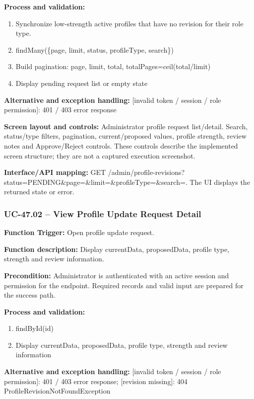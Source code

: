 \textbf{Process and validation:}
\begin{enumerate}
\item Synchronize low-strength active profiles that have no revision for their role type.
\item find\allowbreak{}Many(\{page, limit, status, profile\allowbreak{}Type, search\})
\item Build pagination: page, limit, total, total\allowbreak{}Pages=\allowbreak{}ceil(total/\allowbreak{}limit)
\item Display pending request list or empty state
\end{enumerate}
\textbf{Alternative and exception handling:} [invalid token /\allowbreak{} session /\allowbreak{} role permission]: 401 /\allowbreak{} 403 error response

\textbf{Screen layout and controls:} Administrator profile request list/\allowbreak{}detail. Search, status/\allowbreak{}type filters, pagination, current/\allowbreak{}proposed values, profile strength, review notes and Approve/\allowbreak{}Reject controls. These controls describe the implemented screen structure; they are not a captured execution screenshot.

\textbf{Interface/\allowbreak{}API mapping:} GET /\allowbreak{}admin/\allowbreak{}profile-revisions?status=\allowbreak{}PENDING\&\allowbreak{}page=\allowbreak{}\&\allowbreak{}limit=\allowbreak{}\&\allowbreak{}profile\allowbreak{}Type=\allowbreak{}\&\allowbreak{}search=\allowbreak{}. The UI displays the returned state or error.

\subsubsection{UC-47.02 -- View Profile Update Request Detail}
\textbf{Function Trigger:} Open profile update request.

\textbf{Function description:} Display current\allowbreak{}Data, proposed\allowbreak{}Data, profile type, strength and review information.

\textbf{Precondition:} Administrator is authenticated with an active session and permission for the endpoint. Required records and valid input are prepared for the success path.

\textbf{Process and validation:}
\begin{enumerate}
\item find\allowbreak{}By\allowbreak{}Id(id)
\item Display current\allowbreak{}Data, proposed\allowbreak{}Data, profile type, strength and review information
\end{enumerate}
\textbf{Alternative and exception handling:} [invalid token /\allowbreak{} session /\allowbreak{} role permission]: 401 /\allowbreak{} 403 error response; [revision missing]: 404 Profile\allowbreak{}Revision\allowbreak{}Not\allowbreak{}Found\allowbreak{}Exception

